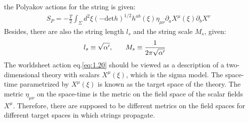 the Polyakov actions for the string is given:
\begin{align}
    \label{eq:1.20}
    S_{P} = -\frac{T}{2} \int _{\Sigma} d^{2} \xi (-\text{det} h) ^{1/2} h^{ab} (\xi) \eta _{\mu \nu} \partial _{a} X^{\mu} (\xi) \partial _{b} X^{\nu} 
\end{align}
Besides, there are also the string length $l_{s}$ and the string scale $M_{s}$, given:
\begin{align}
    l_{s} \equiv \sqrt{\alpha '} , & \qq{} M_{s} \equiv \frac{1}{2\pi \sqrt{\alpha '}}
\end{align}
The worldsheet action eq.\ref{eq:1.20} should be viewed as a description of a two-dimensional theory with scalars $X^{\mu} (\xi)$, which is the sigma model. The space-time parametrized by $X^{\mu} (\xi)$ is known as the target space of the theory. The metric $\eta _{\mu \nu}$ on the space-time is the metric on the field space of the scalar fields $X^{\mu}$. Therefore, there are supposed to be different metrics on the field spaces for different target spaces in which strings propagate.

